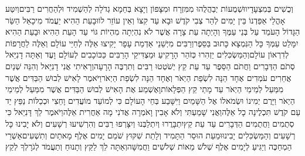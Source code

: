 \documentclass[../main/main.tex]{subfiles}
\begin{document}
\begin{multicols*}{\ncols}
וְכֻשִׁים בְּמִצְעָדָיו\PreVerseSpace{}וּשְׁמֻעוֹת יְבַהֲלֻהוּ מִמִּזְרָח וּמִצָּפוֹן וְיָצָא בְּחֵמָא גְדֹלָה לְהַשְׁמִיד וּלְהַחֲרִים רַבִּים\PreVerseSpace{}וְיִטַּע אָהֳלֵי אַפַּדְנוֹ בֵּין יַמִּים לְהַר צְבִי קֹדֶשׁ וּבָא עַד קִצּוֹ וְאֵין עוֹזֵר לוֹ\PreChapterSpace{}וּבָעֵת הַהִיא יַעֲמֹד מִיכָאֵל הַשַּׂר הַגָּדוֹל הָעֹמֵד עַל בְּנֵי עַמֶּךָ וְהָיְתָה עֵת צָרָה אֲשֶׁר לֹא נִהְיְתָה מִהְיוֹת גּוֹי עַד הָעֵת הַהִיא וּבָעֵת הַהִיא יִמָּלֵט עַמְּךָ כָּל הַנִּמְצָא כָּתוּב בַּסֵּפֶר\PreVerseSpace{}וְרַבִּים מִיְּשֵׁנֵי אַדְמַת עָפָר יָקִיצוּ אֵלֶּה לְחַיֵּי עוֹלָם וְאֵלֶּה לַחֲרָפוֹת לְדִרְאוֹן עוֹלָם\PreVerseSpace{}וְהַמַּשְׂכִּלִים יַזְהִרוּ כְּזֹהַר הָרָקִיעַ וּמַצְדִּיקֵי הָרַבִּים כַּכּוֹכָבִים לְעוֹלָם וָעֶד \ClosedSection{}וְאַתָּה דָנִיֵּאל סְתֹם הַדְּבָרִים וַחֲתֹם הַסֵּפֶר עַד עֵת קֵץ יְשֹׁטְטוּ רַבִּים וְתִרְבֶּה הָרָעָה\SubEnd{}\PreVerseSpace{}וְרָאִיתִי אֲנִי דָנִיֵּאל וְהִנֵּה שְׁנַיִם אֲחֵרִים עֹמְדִים אֶחָד הֵנָּה לִשְׂפַת הַיְאֹר וְאֶחָד הֵנָּה לִשְׂפַת הַיְאֹר\PreVerseSpace{}וַיֹּאמֶר לָאִישׁ לְבוּשׁ הַבַּדִּים אֲשֶׁר מִמַּעַל לְמֵימֵי הַיְאֹר עַד מָתַי קֵץ הַפְּלָאוֹת\PreVerseSpace{}וָאֶשְׁמַע אֶת הָאִישׁ לְבוּשׁ הַבַּדִּים אֲשֶׁר מִמַּעַל לְמֵימֵי הַיְאֹר וַיָּרֶם יְמִינוֹ וּשְׂמֹאלוֹ אֶל הַשָּׁמַיִם וַיִּשָּׁבַע בְּחֵי הָעוֹלָם כִּי לְמוֹעֵד מוֹעֲדִים וָחֵצִי וּכְכַלּוֹת נַפֵּץ יַד עַם קֹדֶשׁ תִּכְלֶינָה כָל אֵלֶּה\PreVerseSpace{}וַאֲנִי שָׁמַעְתִּי וְלֹא אָבִין וָאֹמְרָה אֲדֹנִי מָה אַחֲרִית אֵלֶּה\PreVerseSpace{}וַיֹּאמֶר לֵךְ דָּנִיֵּאל כִּי סְתֻמִים וַחֲתֻמִים הַדְּבָרִים עַד עֵת קֵץ\PreVerseSpace{}יִתְבָּרֲרוּ וְיִתְלַבְּנוּ וְיִצָּרְפוּ רַבִּים וְהִרְשִׁיעוּ רְשָׁעִים וְלֹא יָבִינוּ כָּל רְשָׁעִים וְהַמַּשְׂכִּלִים יָבִינוּ\PreVerseSpace{}וּמֵעֵת הוּסַר הַתָּמִיד וְלָתֵת שִׁקּוּץ שֹׁמֵם יָמִים אֶלֶף מָאתַיִם וְתִשְׁעִים\PreVerseSpace{}אַשְׁרֵי הַמְחַכֶּה וְיַגִּיעַ לְיָמִים אֶלֶף שְׁלֹשׁ מֵאוֹת שְׁלֹשִׁים וַחֲמִשָּׁה\PreVerseSpace{}וְאַתָּה לֵךְ לַקֵּץ וְתָנוּחַ וְתַעֲמֹד לְגֹרָלְךָ לְקֵץ\par
\end{multicols*}
\end{document}
